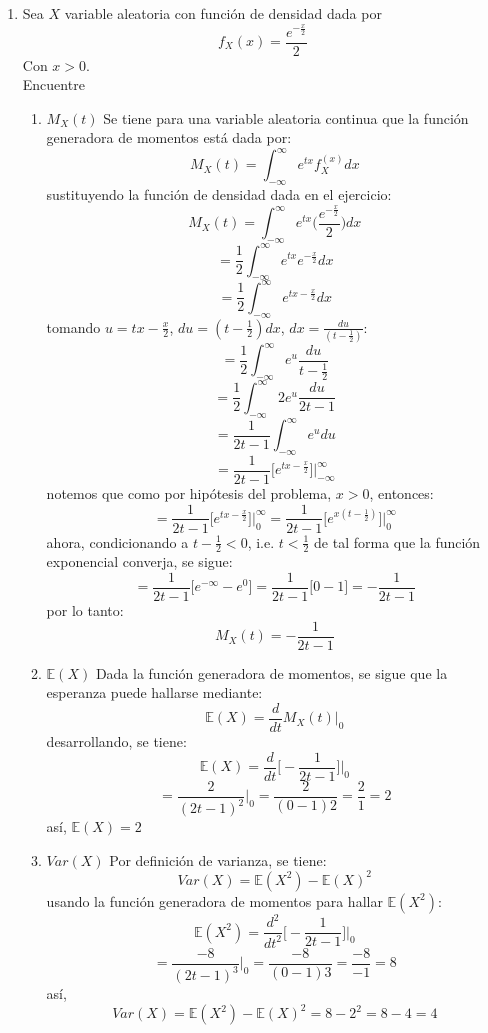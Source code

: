 \documentclass[12pt,a4paper]{report}
\begin{document}
\begin{enumerate}
		\item{
			Sea $X$ variable aleatoria con función de densidad dada por
			\[f_X(x) = \frac{e^{-\frac{x}{2}}}{2}\]
			Con $x > 0$.\\
			Encuentre
			\begin{enumerate}
				\item {
					$M_X(t)$
				}
				\newline
				Se tiene para una variable aleatoria continua que la función
				generadora de momentos está dada por:
					$$ M_X(t) = \int_{-\infty}^{\infty} e^{tx}f_X^{(x)} dx $$
				sustituyendo la función de densidad dada en el ejercicio:
					$$ M_X(t) = \int_{-\infty}^{\infty} e^{tx}
								\Big( \frac{e^{-\frac{x}{2}}}{2} \Big) dx $$
					$$ = \frac{1}{2} \int_{-\infty}^{\infty} e^{tx}
						  e^{-\frac{x}{2}} dx $$
					$$ = \frac{1}{2} \int_{-\infty}^{\infty}
						 e^{tx -\frac{x}{2}} dx $$
				tomando $u = tx -\frac{x}{2}$, $du = (t -\frac{1}{2}) dx$,
				$ dx = \frac{du}{(t -\frac{1}{2})} $:
					$$ = \frac{1}{2} \int_{-\infty}^{\infty}
						 e^u \frac{du}{t -\frac{1}{2}} $$
					$$ = \frac{1}{2} \int_{-\infty}^{\infty}
						 2e^u \frac{du}{2t - 1} $$
					$$ = \frac{1}{2t - 1} \int_{-\infty}^{\infty} e^u du$$
					$$ = \frac{1}{2t - 1} \Big[ e^{tx -\frac{x}{2}} \Big]
						 \Big|_{-\infty}^{\infty}$$
				notemos que como por hipótesis del problema, $ x > 0$, entonces:
				 	$$ = \frac{1}{2t - 1} \Big[ e^{tx -\frac{x}{2}} \Big]
						 \Big|_{0}^{\infty}
					   = \frac{1}{2t - 1} \Big[ e^{x(t -\frac{1}{2})} \Big]
   						 \Big|_{0}^{\infty} $$
				ahora, condicionando a $ t - \frac{1}{2} < 0 $, i.e.
				$ t < \frac{1}{2} $ de tal forma que la función exponencial
				converja, se sigue:
					$$ = \frac{1}{2t - 1} \Big[ e^{- \infty} - e^0 \Big]
					   = \frac{1}{2t - 1} \Big[ 0 - 1 \Big]
					   = - \frac{1}{2t - 1} $$
				por lo tanto:
					$$ M_X(t) = - \frac{1}{2t - 1} $$
				\item {
					$\mathbb{E}(X)$
				}
				\newline
				Dada la función generadora de momentos, se sigue que la
				esperanza puede hallarse mediante:
					$$ \mathbb{E}(X) = \frac{d}{dt} M_X(t) \Big|_{0} $$
				desarrollando, se tiene:
					$$ \mathbb{E}(X)
					 = \frac{d}{dt} \Big[ - \frac{1}{2t - 1} \Big] \Big|_{0} $$
					$$ = \frac{2}{(2t - 1)^2}  \Big|_{0}
					   = \frac{2}{(0 - 1)2} = \frac{2}{1} = 2$$
				así, $ \mathbb{E}(X) = 2 $

				\item {
					$Var(X)$
				}
				\newline
				Por definición de varianza, se tiene:
					$$ Var(X) = \mathbb{E}(X^2) - \mathbb{E}(X)^2$$
				usando la función generadora de momentos para hallar
				$\mathbb{E}(X^2)$:
					$$ \mathbb{E}(X^2)
					 = \frac{d^2}{dt^2} \Big[ - \frac{1}{2t - 1} \Big]
					   \Big|_{0} $$
					$$ = \frac{-8}{(2t - 1)^3}  \Big|_{0}
					   = \frac{-8}{(0 - 1)3} = \frac{-8}{-1} = 8$$
				así,
					$$ Var(X) = \mathbb{E}(X^2) - \mathbb{E}(X)^2
							  = 8 - 2^2 = 8 - 4 = 4$$
			\end{enumerate}
		}


\end{enumerate}
\end{document}
